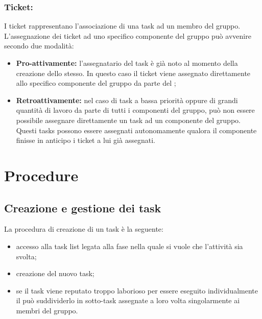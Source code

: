 \documentclass[NormeDiProgetto.tex]{subfiles}
\begin{document}
	\subsubsection{Ticket:}
	I ticket rappresentano l'associazione di una task ad un membro del gruppo.
	L'assegnazione dei ticket ad uno specifico componente del gruppo può avvenire secondo due modalità:
	\begin{itemize}
		\item \textbf{Pro-attivamente:} l'assegnatario del task è già noto al momento della creazione dello stesso. In questo caso il ticket viene assegnato direttamente allo specifico componente del gruppo da parte del \respdiprog; 
		\item \textbf{Retroattivamente:} nel caso di task a bassa priorità oppure di grandi quantità di lavoro da parte di tutti i componenti del gruppo, può non essere possibile assegnare direttamente un task ad un componente del gruppo. Questi tasks possono essere assegnati autonomamente qualora il componente finisse in anticipo i ticket a lui già assegnati.
	\end{itemize}
	
	\section{Procedure}
	\subsection{Creazione e gestione dei task}	
	La procedura di creazione di un task è la seguente:
	\begin{itemize}
		\item accesso alla task list legata alla fase nella quale si vuole che l'attività sia svolta;
		\item creazione del nuovo task;
		\item se il task viene reputato troppo laborioso per essere eseguito individualmente il \respdiprog{} può suddividerlo in sotto-task assegnate a loro volta singolarmente ai membri del gruppo.	
	\end{itemize}		
	
\end{document}
